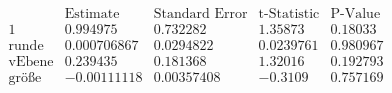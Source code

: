 \[\begin{array}{l|llll}
 \text{} & \text{Estimate} & \text{Standard Error} & \text{t-Statistic} & \text{P-Value} \\
\hline
 1 & 0.994975 & 0.732282 & 1.35873 & 0.18033 \\
 \text{runde} & 0.000706867 & 0.0294822 & 0.0239761 & 0.980967 \\
 \text{vEbene} & 0.239435 & 0.181368 & 1.32016 & 0.192793 \\
 \text{gr{\" o}{\ss}e} & -0.00111118 & 0.00357408 & -0.3109 & 0.757169 \\
\end{array}\]

